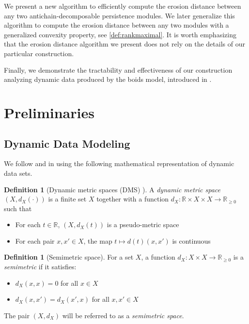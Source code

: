 \documentclass[a4paper,UKenglish,thm-restate]{article}
\theoremstyle{definition}
\newtheorem{definition}[theorem]{Definition}
\begin{document}
    We present a new algorithm to efficiently compute the erosion distance \cite{patelerosion} between any two antichain-decomposable persistence modules. We later generalize this algorithm to compute the erosion distance between any two modules with a generalized convexity property, see \ref{def:rankmaximal}. It is worth emphasizing that the erosion distance algorithm we present does not rely on the details of our particular construction.
    
    Finally, we demonstrate the tractability and effectiveness of our construction analyzing dynamic data produced by the boids model, introduced in \cite{boidsmodel}.
\section{Preliminaries}    
    \subsection{Dynamic Data Modeling}

    We follow \cite{stablesignatures} and \cite{spatiotemporal} in using the following mathematical representation of dynamic data sets.

    \begin{definition}[Dynamic metric spaces (DMS) \cite{stablesignatures}]
    
            A \emph{dynamic metric space} $(X, d_X(\cdot))$ is a finite set $X$ together with a function $d_X:\mathbb{R} \times X \times X \to \mathbb{R}_{\geq 0}$ such that 
            
            \begin{itemize}
                \item[(1)] For each $t \in \mathbb{R}$, $(X, d_X(t))$ is a pseudo-metric space
                \item[(2)] For each pair $x, x' \in X$, the map $t \mapsto d(t)(x, x')$ is continuous
            \end{itemize}
        
    \end{definition}


\begin{definition}[Semimetric space]
            For a set $X$, a function $d_X: X \times X \rightarrow \mathbb{R}_{\geq 0}$ is a \emph{semimetric} if it satisfies:
            \begin{itemize}
                \item $d_X(x, x) = 0$ for all $x \in X$
                \item $d_X(x, x') = d_X(x', x)$ for all $x, x' \in X$
            \end{itemize}
            The pair $(X,d_X)$ will be referred to as a \emph{semimetric space}.
        \end{definition}
        
\end{document}
